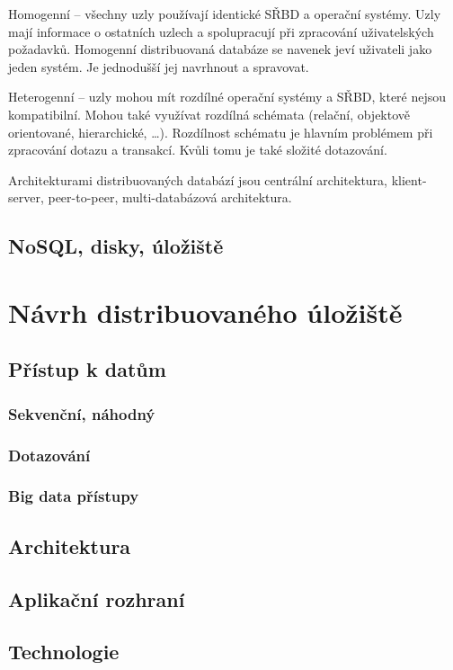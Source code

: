 \noindent Homogenní – všechny uzly používají identické SŘBD a operační systémy. Uzly mají informace o ostatních uzlech a spolupracují při zpracování uživatelských požadavků. Homogenní distribuovaná databáze se navenek jeví uživateli jako jeden systém. Je jednodušší jej navrhnout a spravovat.

Heterogenní – uzly mohou mít rozdílné operační systémy a SŘBD, které nejsou kompatibilní. Mohou také využívat rozdílná schémata (relační, objektově orientované, hierarchické, \ldots). Rozdílnost schématu je hlavním problémem při zpracování dotazu a transakcí. Kvůli tomu je také složité dotazování. \cite{wikiDBMS}

Architekturami distribuovaných databází jsou centrální architektura, klient-server, peer-to-peer, multi-databázová architektura.


\section{NoSQL, disky, úložiště}

\chapter{Návrh distribuovaného úložiště}
\section{Přístup k datům}
\subsection{Sekvenční, náhodný}
\subsection{Dotazování}
\subsection{Big data přístupy}
\section{Architektura}
\section{Aplikační rozhraní}
\section{Technologie}
